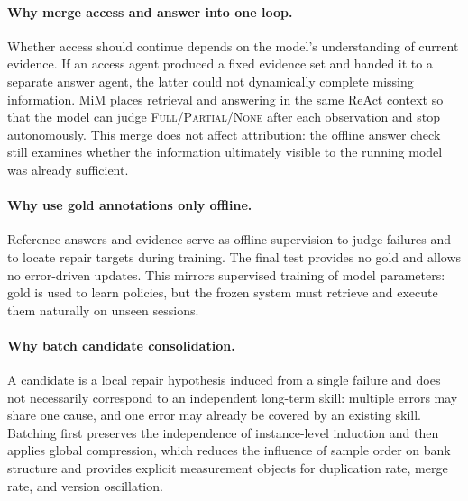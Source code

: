 \documentclass[11pt]{article}
\begin{document}
\paragraph{Why merge access and answer into one loop.}
Whether access should continue depends on the model's understanding of current
evidence. If an access agent produced a fixed evidence set and handed it to a
separate answer agent, the latter could not dynamically complete missing
information. MiM places retrieval and answering in the same ReAct context so
that the model can judge \textsc{Full}/\textsc{Partial}/\textsc{None} after each
observation and stop autonomously. This merge does not affect attribution: the
offline answer check still examines whether the information ultimately visible
to the running model was already sufficient.

\paragraph{Why use gold annotations only offline.}
Reference answers and evidence serve as offline supervision to judge failures
and to locate repair targets during training. The final test provides no gold
and allows no error-driven updates. This mirrors supervised training of model
parameters: gold is used to learn policies, but the frozen system must retrieve
and execute them naturally on unseen sessions.

\paragraph{Why batch candidate consolidation.}
A candidate is a local repair hypothesis induced from a single failure and does
not necessarily correspond to an independent long-term skill: multiple errors
may share one cause, and one error may already be covered by an existing skill.
Batching first preserves the independence of instance-level induction and then
applies global compression, which reduces the influence of sample order on bank
structure and provides explicit measurement objects for duplication rate, merge
rate, and version oscillation.
\end{document}

